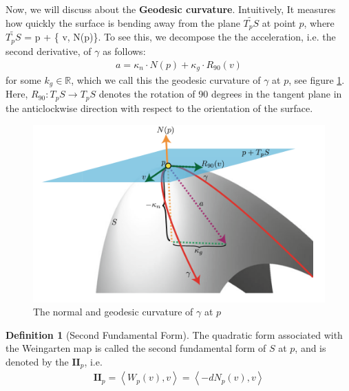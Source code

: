 \documentclass{article}
\theoremstyle{plain}
\theoremstyle{definition}
\newtheorem{definition}{Definition}
\theoremstyle{remark}
\newcommand{\R}{\mathbb{R}}
\begin{document}
Now, we will discuss about the \textbf{Geodesic curvature}. Intuitively, It measures how quickly the surface is bending away from the plane \( \widetilde{T_pS}\) at point \(p\), where \( \widetilde{T_pS}\) = p + \{ v, N(p)\}. To see this, we decompose the the acceleration, i.e. the second derivative, of \( \gamma\) as follows:
\begin{align*}
    a = \kappa_n \cdot N(p) + \kappa_g \cdot R_{90}(v)
\end{align*}
for some \(k_g \in \R\), which we call this the geodesic curvature of \( \gamma\) at \(p\), see figure \ref{fig:normal_and_geodesic_curvature}. Here, \( R_{90}: T_pS \rightarrow T_pS \) denotes the rotation of 90 degrees in the tangent plane in the anticlockwise direction with respect to the orientation of the surface. \\
\begin{figure}[h]
    \centering
    \includegraphics[width=12cm]{./images/normal_and_geodesic_curvature}
    \caption{The normal and geodesic curvature of \(\gamma\) at \(p\)}
    \label{fig:normal_and_geodesic_curvature}
\end{figure}

\begin{definition}[Second Fundamental Form]
    The quadratic form associated with the Weingarten map is called the second fundamental form of \(S\) at \(p\),   and is denoted by the \(\mathbf{II}_p\), i.e.
    \begin{align*}
        \mathbf{II}_p = \left\langle W_p(v), v\right\rangle = \left\langle -dN_p(v), v \right\rangle
    \end{align*}
\end{definition}
\end{document}

